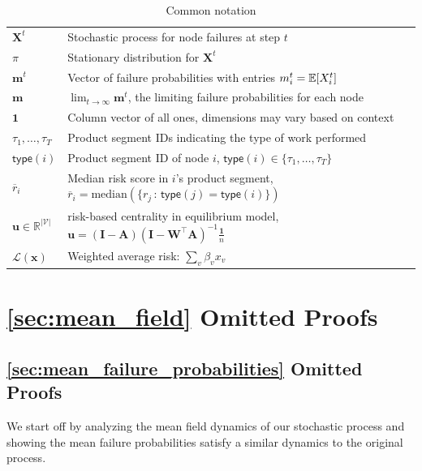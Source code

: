 \documentclass[mnsc,nonblindrev]{informs3}
\newcommand{\Exp}[1]{\mathbb E \left[ #1 \right]} %
\newcommand{\inv}{{-1}}
\newcommand{\GAR}{\mathcal{L}}
\newcommand{\type}{\textsf{type}}
\newcommand{\Xvec}{\mathbf{X}}
\newcommand{\rbar}{\overline{r}}
\newcommand{\A}{\mathbf{A}}
\newcommand{\W}{\mathbf{W}}
\newcommand{\I}{\mathbf{I}}
\newcommand{\uvec}{\mathbf{u}}
\newcommand{\mean}{m}
\newcommand{\meanvec}{\mathbf{\mean}}
\let\originalleft\left
\let\originalright\right
\renewcommand{\left}{\mathopen{}\mathclose\bgroup\originalleft}
\renewcommand{\right}{\aftergroup\egroup\originalright}
\begin{document}
\begin{APPENDICES}
\begin{table}[h!]
\begin{tabular}{>{\color{edits}}l | >{\color{edits}}l}
$\Xvec^t$ & Stochastic process for node failures at step $t$ \\
$\pi$ & Stationary distribution for $\Xvec^{t}$ \\
$\meanvec^t$ & Vector of failure probabilities with entries $\mean_i^t = \Exp{X_i^t}$ \\ 
$\meanvec$ & $\lim_{t \rightarrow \infty} \meanvec^t$, the limiting failure probabilities for each node \\
${\mathbf{1}}$ & Column vector of all ones, dimensions may vary based on context \\
$\tau_1,\dots,\tau_T$ & Product segment IDs indicating the type of work performed \\
$\type(i)$ & Product segment ID of node $i$, $\type(i)\in\{\tau_1,\dots,\tau_T\}$ \\
$\rbar_i$ & Median risk score in $i$'s product segment, $\rbar_i=\text{median}(\{r_j\,:\,\type(j)=\type(i)\})$ \\
$\uvec \in\mathbb{R}^{|\mathcal{V}|}$ & risk-based centrality in equilibrium model, $\uvec = (\I-\A)(\I - \W^\top \A)^\inv \frac{\mathbf{1}}{n}$ \\
$\GAR(\mathbf{x})$ & Weighted average risk: $\sum_{v} \beta_v x_v$ \\
\hline
\end{tabular}
\caption{Common notation}
\label{table:notation}
\end{table}

\section{\cref{sec:mean_field} Omitted Proofs}
\label{app:mean_field_proofs}

\subsection{\cref{sec:mean_failure_probabilities} Omitted Proofs}
\label{sec:limit_mean_proofs}

We start off by analyzing the mean field dynamics of our stochastic process and showing the mean failure probabilities satisfy a similar dynamics to the original process.


\end{APPENDICES}
\end{document}
